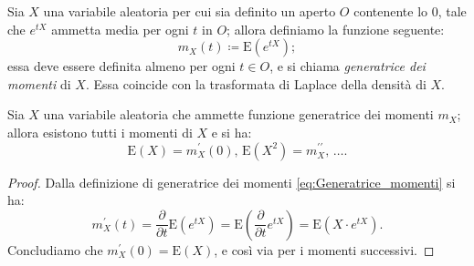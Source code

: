         \begin{defn}
            Sia $X$ una variabile aleatoria per cui sia definito un aperto $O$ contenente lo 0, tale che $e^{tX}$ ammetta media per ogni $t$ in $O$; allora definiamo la funzione seguente:
            \begin{equation}\label{eq:Generatrice_momenti}
                m_X(t) \coloneqq \text{E}(e^{tX})
            ;\end{equation}
            essa deve essere definita almeno per ogni $t \in O$, e si chiama \emph{generatrice dei momenti} di $X$.
            Essa coincide con la trasformata di Laplace della densità di $X$.
        \end{defn}
        \begin{prty}
            Sia $X$ una variabile aleatoria che ammette funzione generatrice dei momenti $m_X$; allora esistono tutti i momenti di $X$ e si ha: \[
                \text{E}(X) = m_X^{\prime}(0),\, \text{E}(X^2) = m_X^{\prime\prime},\, \ldots
            .\] 
        \end{prty}
        \begin{proof}
            Dalla definizione di generatrice dei momenti \eqref{eq:Generatrice_momenti} si ha: \[
                m_X^{\prime}(t) = \frac{\partial}{\partial t}\text{E}(e^{tX})
                = \text{E}\left(\frac{\partial}{\partial t} e^{tX}\right)
                = \text{E}(X\cdot e^{tX})
            .\] Concludiamo che $m_X^{\prime}(0) = \text{E}(X)$, e così via per i momenti successivi.
        \end{proof}
